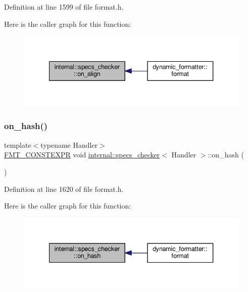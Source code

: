 Definition at line 1599 of file format.\+h.

Here is the caller graph for this function\+:
\nopagebreak
\begin{figure}[H]
\begin{center}
\leavevmode
\includegraphics[width=340pt]{classinternal_1_1specs__checker_ab4c0aaf640c5bf31b031a6fd502213fb_icgraph}
\end{center}
\end{figure}
\mbox{\label{classinternal_1_1specs__checker_a90ca884ae61ca7badce5ca112cd168bb}} 
\subsubsection{\texorpdfstring{on\+\_\+hash()}{on\_hash()}}
{\footnotesize\ttfamily template$<$typename Handler$>$ \\
\hyperlink{core_8h_a69201cb276383873487bf68b4ef8b4cd}{F\+M\+T\+\_\+\+C\+O\+N\+S\+T\+E\+X\+PR} void \hyperlink{classinternal_1_1specs__checker}{internal\+::specs\+\_\+checker}$<$ Handler $>$\+::on\+\_\+hash (\begin{DoxyParamCaption}{ }\end{DoxyParamCaption})\hspace{0.3cm}{\ttfamily [inline]}}



Definition at line 1620 of file format.\+h.

Here is the caller graph for this function\+:
\nopagebreak
\begin{figure}[H]
\begin{center}
\leavevmode
\includegraphics[width=340pt]{classinternal_1_1specs__checker_a90ca884ae61ca7badce5ca112cd168bb_icgraph}
\end{center}
\end{figure}
\mbox{\label{classinternal_1_1specs__checker_ab52e2fc452636fd081d9392956dfe6e9}} 
